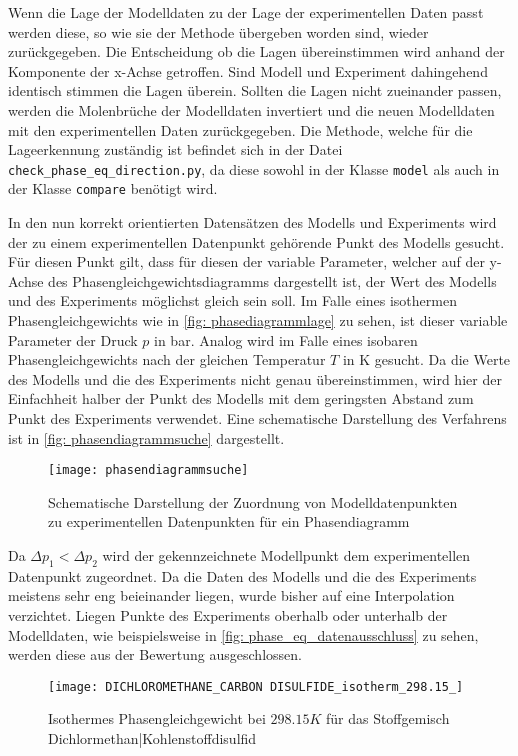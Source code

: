 \documentclass[../thesis.tex]{subfiles}
\begin{document}
Wenn die Lage der Modelldaten zu der Lage der experimentellen Daten passt werden diese, so wie sie der Methode übergeben worden sind, wieder zurückgegeben. Die Entscheidung ob die Lagen übereinstimmen wird anhand der Komponente der x-Achse getroffen. Sind Modell und Experiment dahingehend identisch stimmen die Lagen überein. Sollten die Lagen nicht zueinander passen, werden die Molenbrüche der Modelldaten invertiert und die neuen Modelldaten mit den experimentellen Daten zurückgegeben. Die Methode, welche für die Lageerkennung zuständig ist befindet sich in der Datei \texttt{check\_phase\_eq\_direction.py}, da diese sowohl in der Klasse \texttt{model} als auch in der Klasse \texttt{compare} benötigt wird.

In den nun korrekt orientierten Datensätzen des Modells und Experiments wird der zu einem experimentellen Datenpunkt gehörende Punkt des Modells gesucht. Für diesen Punkt gilt, dass für diesen der variable Parameter, welcher auf der y-Achse des Phasengleichgewichtsdiagramms dargestellt ist, der Wert des Modells und des Experiments möglichst gleich sein soll. Im Falle eines isothermen Phasengleichgewichts wie in \autoref{fig: phasediagrammlage} zu sehen, ist dieser variable Parameter der Druck $ p $ in bar. Analog wird im Falle eines isobaren Phasengleichgewichts nach der gleichen Temperatur $ T $ in K gesucht. Da die Werte des Modells und die des Experiments nicht genau übereinstimmen, wird hier der Einfachheit halber der Punkt des Modells mit dem geringsten Abstand zum Punkt des Experiments verwendet. Eine schematische Darstellung des Verfahrens ist in \autoref{fig: phasendiagrammsuche} dargestellt. 

\begin{figure}[htb]
	\centering
	\texttt{[image: phasendiagrammsuche]}
	\caption{Schematische Darstellung der Zuordnung von Modelldatenpunkten zu experimentellen Datenpunkten für ein Phasendiagramm}
	\label{fig: phasendiagrammsuche}
\end{figure}

Da $\Delta p_1 < \Delta p_2$ wird der gekennzeichnete Modellpunkt dem experimentellen Datenpunkt zugeordnet. Da die Daten des Modells und die des Experiments meistens sehr eng beieinander liegen, wurde bisher auf eine Interpolation verzichtet. Liegen Punkte des Experiments oberhalb oder unterhalb der Modelldaten, wie beispielsweise in \autoref{fig: phase_eq_datenausschluss} zu sehen, werden diese aus der Bewertung ausgeschlossen. 

\begin{figure}[htb]
	\centering
	\texttt{[image: DICHLOROMETHANE\_CARBON DISULFIDE\_isotherm\_298.15\_]}
	\caption{Isothermes Phasengleichgewicht bei $ 298.15 K$ für das Stoffgemisch Dichlormethan|Kohlenstoffdisulfid}
	\label{fig: phase_eq_datenausschluss}
\end{figure}
\end{document}
